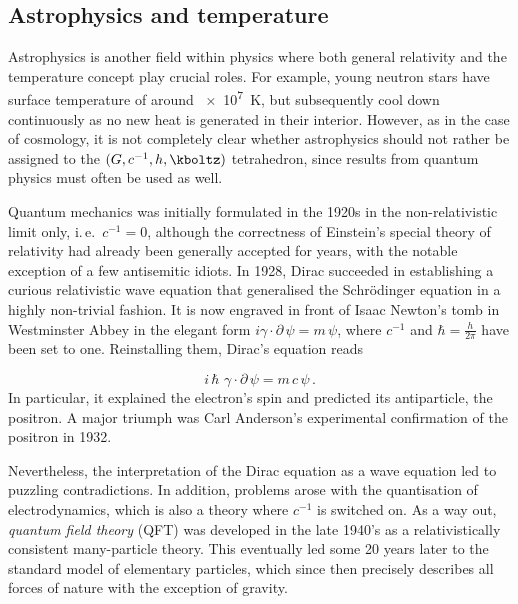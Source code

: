 \documentclass{scrartcl}
\begin{document}
\subsection*{Astrophysics and temperature}

Astrophysics is another field within physics where both general relativity and the temperature concept play crucial roles. For example, young neutron stars have surface temperature of around \qty{e7}{\kelvin}, but subsequently cool down continuously as no new heat is generated in their interior. However, as in the case of cosmology, it is not completely clear whether astrophysics should not rather be assigned to the $(G,c^{-1},h,\kboltz)$ tetrahedron, since results from quantum physics must often be used as well.




\newpage {}
\label{sec:0110}

Quantum mechanics was initially formulated in the 1920s in the non-relativistic limit only, i.\,e.\ $c^{−1}=0$, although the correctness of Einstein's special theory of relativity had already been generally accepted for years, with the notable exception of a few antisemitic idiots. In 1928, Dirac succeeded in establishing a curious relativistic wave equation that generalised the Schrödinger equation in a highly non-trivial fashion. It is now engraved in front of Isaac Newton's tomb in Westminster Abbey in the elegant form $i \gamma \cdot \partial\, \psi = m\, \psi$, where $c^{−1}$ and $\hbar=\frac{h}{2 \pi}$ have been set to one. Reinstalling them, Dirac's equation reads

\begin{equation*}
  i\, \hbar\,\, \gamma \cdot \partial\, \psi = m\,c\, \psi\,.
\end{equation*}
%
In particular, it explained the electron's spin and predicted its antiparticle, the positron. A major triumph was Carl Anderson's experimental confirmation of the positron in 1932.

Nevertheless, the interpretation of the Dirac equation as a wave equation led to puzzling contradictions. In addition, problems arose with the quantisation of electrodynamics, which is also a theory where $c^{−1}$ is switched on. As a way out, \textit{quantum field theory} (QFT) was developed in the late 1940's as a relativistically consistent many-particle theory. This eventually led some 20 years later to the standard model of elementary particles, which since then precisely describes all forces of nature with the exception of gravity.
\end{document}
